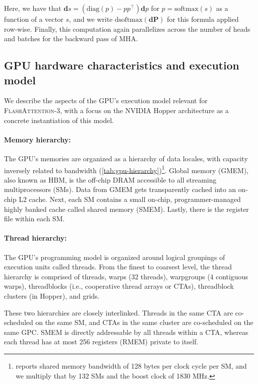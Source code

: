 Here, we have that $\mathbf{d}s = (\mathrm{diag}(p) - p p^\top)\mathbf{d}p$ for $p = \mathrm{softmax}(s)$ as a function of a vector $s$, and we write $\mathrm{dsoftmax}(\mathbf{dP})$ for this formula applied row-wise. Finally, this computation again parallelizes across the number of heads and batches for the backward pass of MHA.

\subsection{GPU hardware characteristics and execution model}
\label{subsec:hardware}

We describe the aspects of the GPU's execution model relevant for \textsc{FlashAttention-3}, with a focus on the NVIDIA Hopper architecture as a concrete instantiation of this model.

\paragraph{Memory hierarchy:} The GPU's memories are organized as a hierarchy of data locales, with capacity inversely related to bandwidth (\cref{tab:gpu-hierarchy})\footnote{\citet{luo2024benchmarking} reports shared memory bandwidth of 128 bytes per clock cycle per SM, and we multiply that by 132 SMs and the boost clock of 1830 MHz.}. Global memory (GMEM), also known as HBM, is the off-chip DRAM accessible to all streaming multiprocessors (SMs). Data from GMEM gets transparently cached into an on-chip L2 cache. Next, each SM contains a small on-chip, programmer-managed highly banked cache called shared memory (SMEM). Lastly, there is the register file within each SM.

\paragraph{Thread hierarchy:} The GPU's programming model is organized around logical groupings of execution units called threads. From the finest to coarsest level, the thread hierarchy is comprised of threads, warps (32 threads), warpgroups (4 contiguous warps), threadblocks (i.e., cooperative thread arrays or CTAs), threadblock clusters (in Hopper), and grids.

These two hierarchies are closely interlinked. Threads in the same CTA are co-scheduled on the same SM, and CTAs in the same cluster are co-scheduled on the same GPC. SMEM is directly addressable by all threads within a CTA, whereas each thread has at most 256 registers (RMEM) private to itself.

